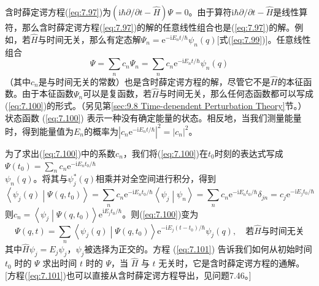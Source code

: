     含时薛定谔方程(\ref{eq:7.97})为$\left(\mathrm{i}\hbar \partial /\partial t - \hat{H}\right)\Psi = 0$。由于算符$\mathrm{i}\hbar \partial /\partial t - \hat{H}$是线性算符，那么含时薛定谔方程(\ref{eq:7.97})的解的任意线性组合也是(\ref{eq:7.97})的解。例如，若$\hat{H}$与时间无关，那么有定态解$\Psi_n = \mathrm{e}^{-\mathrm{i}E_nt/\hbar}\psi_n\left(q\right)$[式(\ref{eq:7.99})]。任意线性组合
    \begin{equation}
        \Psi = \sum_{n}c_n\Psi_n = \sum_{n}c_n\mathrm{e}^{-\mathrm{i}E_nt/\hbar}\psi_n\left(q\right)
        \label{eq:7.100}
    \end{equation}
    （其中$c_n$是与时间无关的常数）也是含时薛定谔方程的解，尽管它不是$\hat{H}$的本征函数。由于本征函数$\Psi_n$可以是复函数，若$\hat{H}$与时间无关，那么任何态函数都可以写成(\ref{eq:7.100})的形式。（另见第\ref{sec:9.8 Time-dependent Perturbation Theory}节。）状态函数 (\ref{eq:7.100}) 表示一种没有确定能量的状态。相反地，当我们测量能量时，得到能量值为$E_n$的概率为$\left|c_n\mathrm{e}^{-\mathrm{i}E_nt/\hbar}\right|^2 = \left|c_n\right|^2$。

    为了求出(\ref{eq:7.100})中的系数$c_n$，我们将(\ref{eq:7.100})在$t_0$时刻的表达式写成$\Psi\left(t_0\right) = \sum_{n}c_n\mathrm{e}^{-\mathrm{i}E_nt_0/\hbar}$\\$\psi_n\left(q\right)$。将其与$\psi_j^{\ast}\left(q\right)$相乘并对全空间进行积分，得到
    \begin{equation*}
        \left\langle \psi_j\left(q\right) \middle| \Psi\left(q,t_0\right) \right\rangle = \sum_{n}c_n\mathrm{e}^{-\mathrm{i}E_nt_0/\hbar}\left\langle \psi_j \middle| \psi_n \right\rangle = \sum_{n}c_n\mathrm{e}^{-\mathrm{i}E_nt_0/\hbar}\delta_{jn} = c_j\mathrm{e}^{-\mathrm{i}E_jt_0/\hbar}
    \end{equation*}
    则$c_n = \left\langle \psi_j \middle| \Psi\left(q,t_0\right) \right\rangle \mathrm{e}^{\mathrm{i}E_jt_0/\hbar}$。则(\ref{eq:7.100})变为
    \begin{equation}
        \Psi\left(q,t\right) = \sum_{n}\left\langle \psi_j \left(q\right) \middle| \Psi\left(q,t_0\right) \right\rangle \mathrm{e}^{-\mathrm{i}E_j\left(t-t_0\right)/\hbar}\psi_j\left(q\right), \quad \text{若}\hat{H}\text{与时间无关}
        \label{eq:7.101}
    \end{equation}
    其中$\hat{H}\psi_j = E_j\psi_j$，$\psi_j$被选择为正交的。方程 (\ref{eq:7.101}) 告诉我们如何从初始时间 $t_0$ 时的 $\Psi$ 求出时间 $t$ 时的 $\Psi$，当 $\hat{H}$ 与 $t$ 无关时，它是含时薛定谔方程的通解。[方程(\ref{eq:7.101})也可以直接从含时薛定谔方程导出，见问题7.46。]

